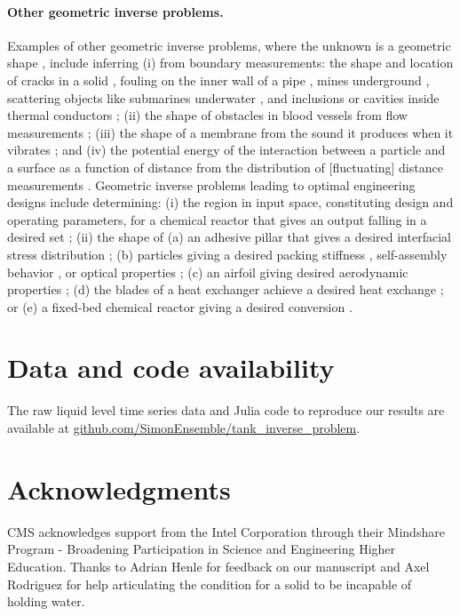 \documentclass[a4paper,fleqn]{cas-dc}
\begin{document}
\paragraph{Other geometric inverse problems.}
Examples of other geometric inverse problems, where the unknown is a geometric shape \cite{ameur2004level,burger2001level,harbrecht2013numerical,kawakami2020stabilities}, include inferring
(i) from boundary measurements: the shape and location of cracks in a solid \cite{nishimura1991boundary}, fouling on the inner wall of a pipe \cite{chen2011inverse}, mines underground \cite{delbary2007inverse,lopez2003detection}, scattering objects like submarines \cite{yaman2013survey} underwater \cite{buchanan2004marine}, and inclusions or cavities inside thermal conductors \cite{wang2018numerical,nakamura2015reconstruction};
(ii) the shape of obstacles in blood vessels from flow measurements \cite{aguayo2021distributed,nolte2022inverse}; 
(iii) the shape of a membrane from the sound it produces when it vibrates \cite{kac1966can}; 
and (iv) the potential energy of the interaction between a particle and a surface as a function of distance from the distribution of [fluctuating] distance measurements \cite{prieve1999measurement}.
Geometric inverse problems leading to optimal engineering designs include determining: 
(i) the region in input space, constituting design and operating parameters, for a chemical reactor that gives an output falling in a desired set \cite{alves2023inverse,gazzaneo2019process}; 
(ii) the shape of (a) an adhesive pillar that gives a desired interfacial stress distribution \cite{kim2020designing};
(b) particles giving a desired packing stiffness \cite{miskin2013adapting}, self-assembly behavior \cite{sacanna2013engineering}, or optical properties \cite{forestiere2016inverse};
(c) an airfoil giving desired aerodynamic properties \cite{sun2015artificial};
(d) the blades of a heat exchanger achieve a desired heat exchange \cite{hilbert2006multi};
or
(e) a fixed-bed chemical reactor giving a desired conversion \cite{courtais2021shape}. 

\section*{Data and code availability} The raw liquid level time series data and Julia code to reproduce our results are available at \url{github.com/SimonEnsemble/tank_inverse_problem}.


\section*{Acknowledgments}
CMS acknowledges support from the Intel Corporation through their Mindshare Program - Broadening Participation in Science and Engineering Higher Education. 
Thanks to 
Adrian Henle for feedback on our manuscript and Axel Rodriguez for help articulating the condition for a solid to be incapable of holding water.
\end{document}
